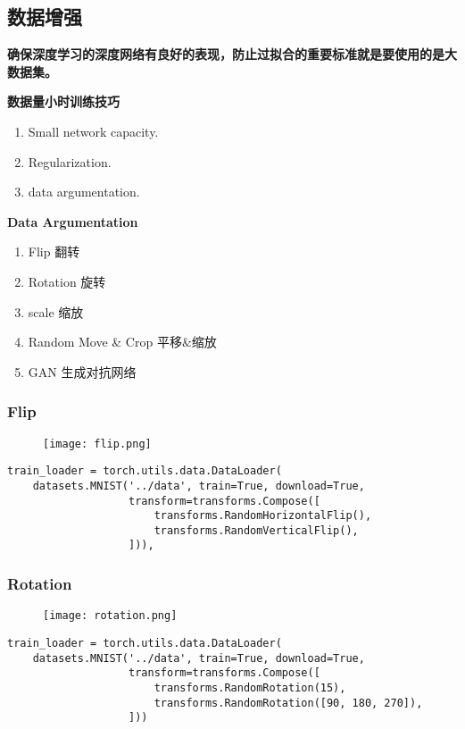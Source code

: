 \subsection{数据增强}
\textbf{确保深度学习的深度网络有良好的表现，防止过拟合的重要标准就是要使用的是大数据集。}

\noindent\textbf{数据量小时训练技巧}
\begin{enumerate}
  \item Small network capacity.
  \item Regularization.
  \item data argumentation.
\end{enumerate}

\noindent\textbf{Data Argumentation}
\begin{enumerate}
  \item Flip 翻转
  \item Rotation 旋转
  \item scale 缩放
  \item Random Move \& Crop  平移\&缩放
  \item GAN 生成对抗网络
\end{enumerate}
\subsubsection{Flip}
\begin{figure}[!h]
  \centering
  \texttt{[image: flip.png]}
\end{figure}

\begin{lstlisting}
train_loader = torch.utils.data.DataLoader(
    datasets.MNIST('../data', train=True, download=True,
                   transform=transforms.Compose([
                       transforms.RandomHorizontalFlip(),
                       transforms.RandomVerticalFlip(),
                   ])),
\end{lstlisting}
\newpage
\subsubsection{Rotation}
\begin{figure}[!h]
  \centering
  \texttt{[image: rotation.png]}
\end{figure}

\begin{lstlisting}
train_loader = torch.utils.data.DataLoader(
    datasets.MNIST('../data', train=True, download=True,
                   transform=transforms.Compose([
                       transforms.RandomRotation(15),
                       transforms.RandomRotation([90, 180, 270]),
                   ]))
\end{lstlisting}

